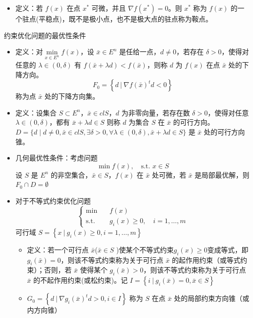 \begin{remark}
    \text{}\begin{itemize}
        \item 定义：若 $f(x)$ 在点 $x^*$ 可微，并且 $\nabla f(x^*) = 0$。则 $x^*$ 称为 $f(x)$ 的一个驻点(平稳点)，既不是极小点，也不是极大点的驻点称为鞍点。
    \end{itemize}
\end{remark}

\begin{remark}
    约束优化问题的最优性条件
    \begin{itemize}
        \item 定义：对$\underset{x \in E^n}{\min}f(x)$，设 $\bar{x} \in E^n$ 是任给一点，$d\neq 0$，若存在 $\delta > 0$，使得对任意的 $\lambda \in (0, \delta)$ 有 $f(\bar{x} + \lambda d) < f(\bar{x})$，则称 $d$ 为 $f(x)$ 在点 $\bar{x}$ 处的下降方向。\[F_0 = \left\{d\ |\ \nabla f(\bar{x})^td < 0\right\}\]称为点 $\bar{x}$ 处的下降方向集。
        \item 定义：设集合 $S \subset E^n$，$\bar{x} \in clS$，$d$ 为非零向量，若存在数 $\delta > 0$，使得对任意 $\lambda \in (0, \delta)$，都有 $\bar{x} + \lambda d \in S$ 则称 $d$ 为集合 $S$ 在 $\bar{x}$ 的可行方向。$D=\{d \mid d \neq 0, \bar{x} \in c l S, \exists \delta>0, \forall \lambda \in(0, \delta), \bar{x}+\lambda d \in S\}$ 是 $\bar{x}$ 处的可行方向锥。
        \item 几何最优性条件：考虑问题\[\min f(x), \quad \text{s.t. } x \in S\]设 $S$ 是 $E^n$ 的非空集合，$\bar{x} \in S$，$f(x)$ 在 $\bar{x}$ 处可微，若 $\bar{x}$ 是局部最优解，则 $F_0\cap D = \emptyset$
        \item 对于不等式约束优化问题\[\begin{cases}
            \min \quad &f(x)\\
            \text{s.t.} \quad &g_i(x) \ge 0, \quad i = 1, \dots, m
        \end{cases}\]
        可行域 $S = \left\{x\ |\ g_i(x) \ge 0, i = 1, \dots, m\right\}$
        \begin{itemize}
            \item 定义：若一个可行点 $\bar{x}$($\bar{x} \in S$ )使某个不等式约束$g_i(x) \ge 0$变成等式，即 $g_i(\bar{x}) = 0$，则该不等式约束称为关于可行点 $\bar{x}$ 的起作用约束（或等式约束）；否则，若 $\bar{x}$ 使得某个 $g_i(\bar{x}) > 0$，则该不等式约束称为关于可行点 $\bar{x}$ 的不起作用约束(或松约束)。记 $I = \left\{i\ |\ g_i(\bar{x}) = 0, \bar{x} \in S\right\}$
            \item $G_0 = \left\{d \ |\ \nabla g_i(\bar{x})^td > 0, i \in I\right\}$ 称为 $S$ 在点 $\bar{x}$ 处的局部约束方向锥（或内方向锥）

\end{itemize}
\end{itemize}
\end{remark}
